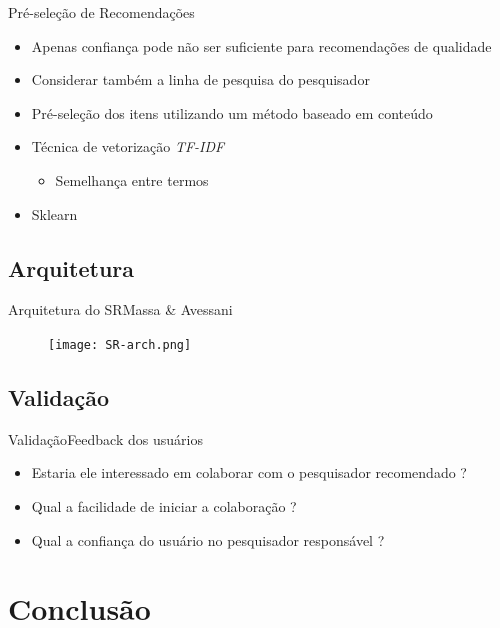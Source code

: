 \documentclass{beamer}
\begin{document}
\begin{frame}{Pré-seleção de Recomendações}{}
  \begin{itemize}
    \item Apenas confiança pode não ser suficiente para recomendações de qualidade
    \item Considerar também a linha de pesquisa do pesquisador
    \item Pré-seleção dos itens utilizando um método baseado em conteúdo
    \item Técnica de vetorização \textit{TF-IDF}
    \begin{itemize}
      \item Semelhança entre termos
    \end{itemize}
    \item Sklearn
  \end{itemize}
\end{frame}

\subsection{Arquitetura}

\begin{frame}{Arquitetura do SR}{Massa \& Avessani}
  \begin{figure}[ht]
    \texttt{[image: SR-arch.png]}
    \label{fig:sr-arch}
  \end{figure}
\end{frame}

\subsection{Validação}

\begin{frame}{Validação}{Feedback dos usuários}
  \begin{itemize}
    \item Estaria ele interessado em colaborar com o pesquisador recomendado ?
    \item Qual a facilidade de iniciar a colaboração ?
    \item Qual a confiança do usuário no pesquisador responsável ?  
  \end{itemize}
\end{frame}

\section{Conclusão}
\end{document}
